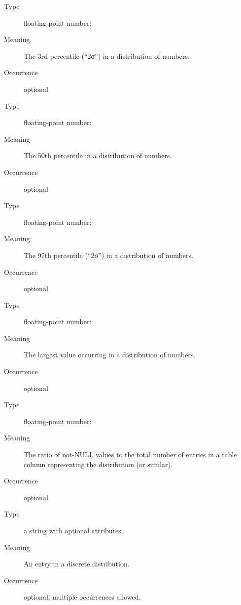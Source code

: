 \documentclass[11pt,a4paper]{ivoa}
\begin{document}
\begin{generated}
\begin{bigdescription}
\begin{description}
\end{description}
\item[Element \xmlel{percentile03}]
\begin{description}
\item[Type] floating-point number: 
\item[Meaning] The 3rd percentile (“2σ”) in a distribution of numbers.
\item[Occurrence] optional

\end{description}
\item[Element \xmlel{median}]
\begin{description}
\item[Type] floating-point number: 
\item[Meaning] The 50th percentile in a distribution of numbers.
\item[Occurrence] optional

\end{description}
\item[Element \xmlel{percentile97}]
\begin{description}
\item[Type] floating-point number: 
\item[Meaning] The 97th percentile (“2σ”) in a distribution of numbers.
\item[Occurrence] optional

\end{description}
\item[Element \xmlel{max}]
\begin{description}
\item[Type] floating-point number: 
\item[Meaning] The largest value occurring in a distribution of numbers.
\item[Occurrence] optional

\end{description}
\item[Element \xmlel{fillFactor}]
\begin{description}
\item[Type] floating-point number: 
\item[Meaning] The ratio of not-NULL values to the total number of entries
               in a table column representing the distribution (or similar).
\item[Occurrence] optional

\end{description}
\item[Element \xmlel{option}]
\begin{description}
\item[Type] a string with optional attributes
\item[Meaning] An entry in a discrete distribution.
\item[Occurrence] optional; multiple occurrences allowed.


\end{description}
\end{bigdescription}
\end{generated}
\end{document}
